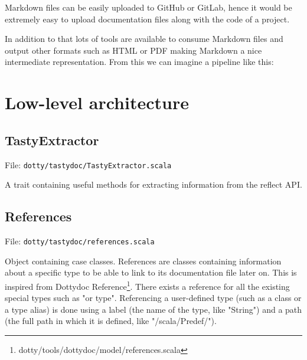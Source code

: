 \documentclass{report}
\begin{document}
Markdown files can be easily uploaded to GitHub or GitLab, hence it would be extremely easy to upload documentation files along with the code of a project.

In addition to that lots of tools are available to consume Markdown files and output other formats such as HTML or PDF making Markdown a nice intermediate representation. From this we can imagine a pipeline like this:
\begin{center}
\end{center}

\section{Low-level architecture}
\subsection{TastyExtractor}
File: \texttt{dotty/tastydoc/TastyExtractor.scala}

A trait containing useful methods for extracting information from the reflect API.

\subsection{References}
File: \texttt{dotty/tastydoc/references.scala}

Object containing case classes. References are classes containing information about a specific type to be able to link to its documentation file later on. This is inspired from Dottydoc Reference\footnote{dotty/tools/dottydoc/model/references.scala}. There exists a reference for all the existing special types such as "or type". Referencing a user-defined type (such as a class or a type alias) is done using a label (the name of the type, like "String") and a path (the full path in which it is defined, like "/scala/Predef/").
\end{document}
